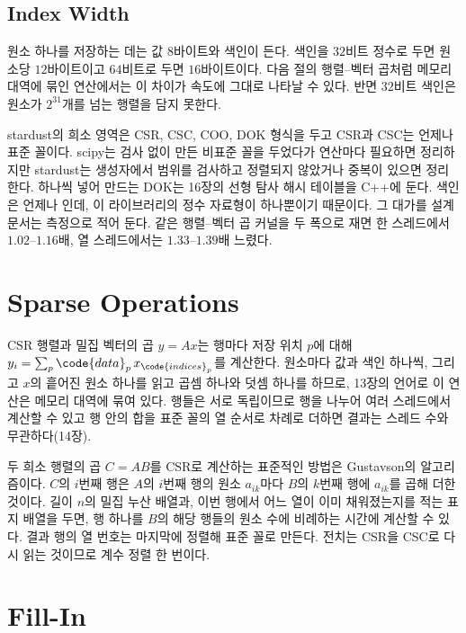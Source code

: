 \subsection{Index Width}

원소 하나를 저장하는 데는 값 $8$바이트와 색인이 든다. 색인을 $32$비트 정수로 두면 원소당 $12$바이트이고 $64$비트로 두면 $16$바이트이다. 다음 절의 행렬--벡터 곱처럼 메모리 대역에 묶인 연산에서는 이 차이가 속도에 그대로 나타날 수 있다. 반면 $32$비트 색인은 원소가 $2^{31}$개를 넘는 행렬을 담지 못한다.

\begin{instardust}
stardust의 희소 영역은 CSR, CSC, COO, DOK 형식을 두고 CSR과 CSC는 언제나 표준 꼴이다. scipy는 검사 없이 만든 비표준 꼴을 두었다가 연산마다 필요하면 정리하지만 stardust는 생성자에서 범위를 검사하고 정렬되지 않았거나 중복이 있으면 정리한다. 하나씩 넣어 만드는 DOK는 16장의 선형 탐사 해시 테이블을 C++에 둔다. 색인은 언제나 인데, 이 라이브러리의 정수 자료형이  하나뿐이기 때문이다. 그 대가를 설계 문서는 측정으로 적어 둔다. 같은 행렬--벡터 곱 커널을 두 폭으로 재면 한 스레드에서 $1.02$--$1.16$배, 열 스레드에서는 $1.33$--$1.39$배 느렸다.
\end{instardust}

\section{Sparse Operations}
\label{sec:sparse-ops}

CSR 행렬과 밀집 벡터의 곱 $y=Ax$는 행마다 저장 위치 $p$에 대해 $y_i=\sum_p\code{data}_p\,x_{\code{indices}_p}$를 계산한다. 원소마다 값과 색인 하나씩, 그리고 $x$의 흩어진 원소 하나를 읽고 곱셈 하나와 덧셈 하나를 하므로, 13장의 언어로 이 연산은 메모리 대역에 묶여 있다. 행들은 서로 독립이므로 행을 나누어 여러 스레드에서 계산할 수 있고 행 안의 합을 표준 꼴의 열 순서로 차례로 더하면 결과는 스레드 수와 무관하다(14장).

두 희소 행렬의 곱 $C=AB$를 CSR로 계산하는 표준적인 방법은 Gustavson의 알고리즘이다\cite{gustavson1978}. $C$의 $i$번째 행은 $A$의 $i$번째 행의 원소 $a_{ik}$마다 $B$의 $k$번째 행에 $a_{ik}$를 곱해 더한 것이다. 길이 $n$의 밀집 누산 배열과, 이번 행에서 어느 열이 이미 채워졌는지를 적는 표지 배열을 두면, 행 하나를 $B$의 해당 행들의 원소 수에 비례하는 시간에 계산할 수 있다. 결과 행의 열 번호는 마지막에 정렬해 표준 꼴로 만든다. 전치는 CSR을 CSC로 다시 읽는 것이므로 계수 정렬 한 번이다.

\section{Fill-In}
\label{sec:fill-in}

